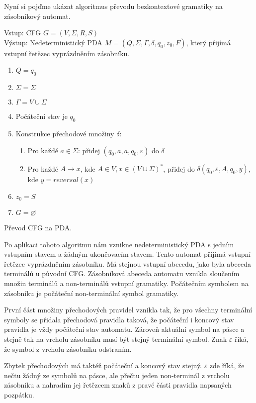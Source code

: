 Nyní si pojďme ukázat algoritmus převodu bezkontextové gramatiky na zásobníkový automat. \cite{CFG_to_PDA}

\begin{framed}
	Vstup: CFG \(G = (V,\Sigma, R, S) \)\\
	Výstup: Nedeterministický PDA \(M = (Q, \Sigma, \Gamma, \delta, q_0, z_0, F) \), který přijímá vstupní řetězec vyprázdněním zásobníku. 
	\begin{enumerate}
		\item \(Q = {q_0}\)
		\item \(\Sigma = \Sigma\)
		\item \(\Gamma = V \cup \Sigma \)
		\item Počáteční stav je \(q_0\)
		\item Konstrukce přechodové množiny \( \delta \):
		\begin{enumerate}
			\item Pro každé $a \in \Sigma$: přidej $(q_0,a,a,q_0,\varepsilon)$ do $\delta$
			\item Pro každé $A \rightarrow x$, kde $A \in V, x \in (V \cup \Sigma)^*$, přidej do $\delta (q_0, \varepsilon, A, q_0, y)$, 
			kde $y = reversal(x)$
		\end{enumerate}
		\item \(z_0 = S\)
		\item $G = \varnothing$
	\end{enumerate}
\end{framed}
\begin{myAlgorithm}
	Převod CFG na PDA.
\end{myAlgorithm}

Po aplikaci tohoto algoritmu nám vznikne nedeterministický PDA s jedním vstupním stavem a žádným ukončovacím stavem. Tento automat přijímá vstupní řetězec vyprázdněním zásobníku. Má stejnou vstupní abecedu, jako byla abeceda terminálů u původní CFG. Zásobníková abeceda automatu vznikla sloučením množin terminálů a non-terminálů vstupní gramatiky. Počátečním symbolem na zásobníku je počáteční non-terminální symbol gramatiky. 

První část množiny přechodových pravidel vznikla tak, že pro všechny terminální symboly se přidala přechodová pravidla taková, že počáteční i koncový stav pravidla je vždy počáteční stav automatu. Zároveň aktuální symbol na pásce a stejně tak na vrcholu zásobníku musí být stejný terminální symbol. Znak $\varepsilon$ říká, že symbol z vrcholu zásobníku odstraním. 

Zbytek přechodových má taktéž počáteční a koncový stav stejný. $\varepsilon$ zde říká, že nečtu žádný ze symbolů na pásce, ale přečtu jeden non-terminál z vrcholu zásobníku a nahradím jej řetězcem znaků z pravé části pravidla napsaných pozpátku.  

